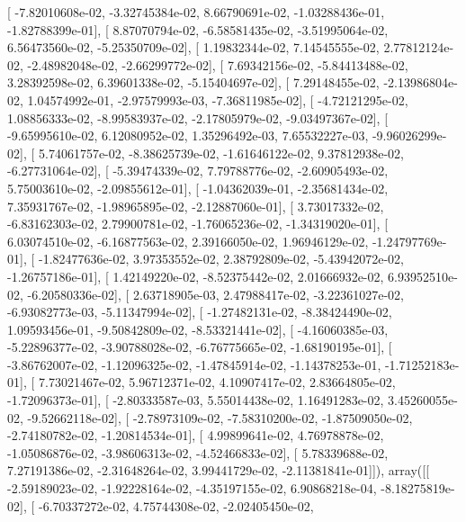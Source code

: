 \documentclass{article}
\begin{document}
       [ -7.82010608e-02,  -3.32745384e-02,   8.66790691e-02,
         -1.03288436e-01,  -1.82788399e-01],
       [  8.87070794e-02,  -6.58581435e-02,  -3.51995064e-02,
          6.56473560e-02,  -5.25350709e-02],
       [  1.19832344e-02,   7.14545555e-02,   2.77812124e-02,
         -2.48982048e-02,  -2.66299772e-02],
       [  7.69342156e-02,  -5.84413488e-02,   3.28392598e-02,
          6.39601338e-02,  -5.15404697e-02],
       [  7.29148455e-02,  -2.13986804e-02,   1.04574992e-01,
         -2.97579993e-03,  -7.36811985e-02],
       [ -4.72121295e-02,   1.08856333e-02,  -8.99583937e-02,
         -2.17805979e-02,  -9.03497367e-02],
       [ -9.65995610e-02,   6.12080952e-02,   1.35296492e-03,
          7.65532227e-03,  -9.96026299e-02],
       [  5.74061757e-02,  -8.38625739e-02,  -1.61646122e-02,
          9.37812938e-02,  -6.27731064e-02],
       [ -5.39474339e-02,   7.79788776e-02,  -2.60905493e-02,
          5.75003610e-02,  -2.09855612e-01],
       [ -1.04362039e-01,  -2.35681434e-02,   7.35931767e-02,
         -1.98965895e-02,  -2.12887060e-01],
       [  3.73017332e-02,  -6.83162303e-02,   2.79900781e-02,
         -1.76065236e-02,  -1.34319020e-01],
       [  6.03074510e-02,  -6.16877563e-02,   2.39166050e-02,
          1.96946129e-02,  -1.24797769e-01],
       [ -1.82477636e-02,   3.97353552e-02,   2.38792809e-02,
         -5.43942072e-02,  -1.26757186e-01],
       [  1.42149220e-02,  -8.52375442e-02,   2.01666932e-02,
          6.93952510e-02,  -6.20580336e-02],
       [  2.63718905e-03,   2.47988417e-02,  -3.22361027e-02,
         -6.93082773e-03,  -5.11347994e-02],
       [ -1.27482131e-02,  -8.38424490e-02,   1.09593456e-01,
         -9.50842809e-02,  -8.53321441e-02],
       [ -4.16060385e-03,  -5.22896377e-02,  -3.90788028e-02,
         -6.76775665e-02,  -1.68190195e-01],
       [ -3.86762007e-02,  -1.12096325e-02,  -1.47845914e-02,
         -1.14378253e-01,  -1.71252183e-01],
       [  7.73021467e-02,   5.96712371e-02,   4.10907417e-02,
          2.83664805e-02,  -1.72096373e-01],
       [ -2.80333587e-03,   5.55014438e-02,   1.16491283e-02,
          3.45260055e-02,  -9.52662118e-02],
       [ -2.78973109e-02,  -7.58310200e-02,  -1.87509050e-02,
         -2.74180782e-02,  -1.20814534e-01],
       [  4.99899641e-02,   4.76978878e-02,  -1.05086876e-02,
         -3.98606313e-02,  -4.52466833e-02],
       [  5.78339688e-02,   7.27191386e-02,  -2.31648264e-02,
          3.99441729e-02,  -2.11381841e-01]]), array([[ -2.59189023e-02,  -1.92228164e-02,  -4.35197155e-02,
          6.90868218e-04,  -8.18275819e-02],
       [ -6.70337272e-02,   4.75744308e-02,  -2.02405450e-02,
\end{document}
